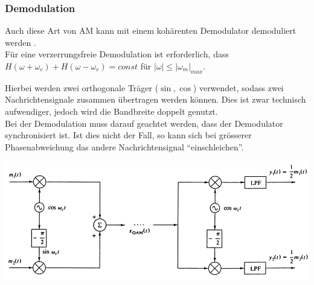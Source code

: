 \subsubsection{Demodulation}
Auch diese Art von AM kann mit einem kohärenten Demodulator demoduliert
werden .\\
Für eine verzerrungsfreie Demodulation ist erforderlich, dass $H(\omega +
\omega_c) + H(\omega - \omega_c) = const$ für $|\omega| \leq |\omega_m|_{max}$.



Hierbei werden zwei orthogonale Träger ($\sin, \cos$) verwendet, sodass zwei Nachrichtensignale
zusammen übertragen werden können. Dies ist zwar technisch aufwendiger, jedoch wird die Bandbreite
doppelt genutzt. \\
Bei der Demodulation muss darauf geachtet werden, dass der Demodulator synchronisiert ist. Ist dies
nicht der Fall, so kann sich bei grösserer Phasenabweichung das andere Nachrichtensignal
``einschleichen''.
\begin{center}
    \includegraphics[width=14cm]{bilder/am_qam_modulatorDemodulator.png}
\end{center}

